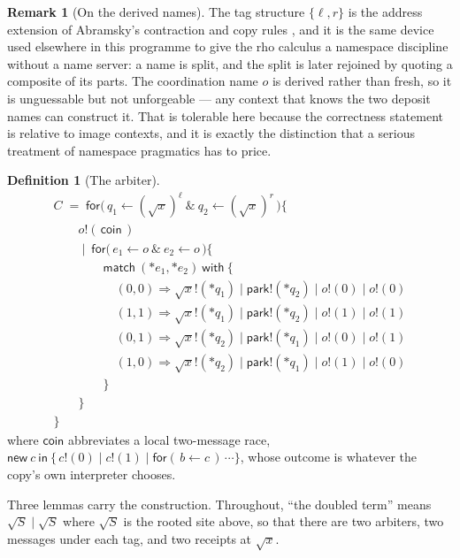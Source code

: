 \documentclass[11pt]{article}
\theoremstyle{definition}
\newtheorem{definition}[theorem]{Definition}
\newtheorem{remark}[theorem]{Remark}
\newcommand{\rhoc}{rho calculus}
\newcommand{\In}[2]{\mathsf{for}(\,#1 \leftarrow #2\,)}
\newcommand{\rt}[1]{\sqrt{#1}}
\begin{document}
\begin{remark}[On the derived names]
The tag structure $\{\ell, r\}$ is the address extension of Abramsky's contraction and copy rules \cite{Abramsky}, and it is the same device used elsewhere in this programme to give the \rhoc{} a namespace discipline without a name server: a name is split, and the split is later rejoined by quoting a composite of its parts. The coordination name $o$ is derived rather than fresh, so it is unguessable but not unforgeable --- any context that knows the two deposit names can construct it. That is tolerable here because the correctness statement is relative to image contexts, and it is exactly the distinction that a serious treatment of namespace pragmatics has to price.
\end{remark}

\begin{definition}[The arbiter]\label{def:arbiter}
\[
\begin{array}{l}
C \;=\; \mathsf{for}\big(\,q_1 \leftarrow (\rt{x})^{\ell}\ \&\ q_2 \leftarrow (\rt{x})^{r}\,\big)\big\{ \\
\qquad o!(\,\mathsf{coin}\,) \\
\qquad \mid\ \mathsf{for}\big(\,e_1 \leftarrow o\ \&\ e_2 \leftarrow o\,\big)\big\{ \\
\qquad\qquad \mathsf{match}\ ({*}e_1, {*}e_2)\ \mathsf{with}\ \{ \\
\qquad\qquad\quad (0,0) \Rightarrow \rt{x}!({*}q_1) \mid \mathsf{park}!({*}q_2) \mid o!(0) \mid o!(0) \\
\qquad\qquad\quad (1,1) \Rightarrow \rt{x}!({*}q_1) \mid \mathsf{park}!({*}q_2) \mid o!(1) \mid o!(1) \\
\qquad\qquad\quad (0,1) \Rightarrow \rt{x}!({*}q_2) \mid \mathsf{park}!({*}q_1) \mid o!(0) \mid o!(1) \\
\qquad\qquad\quad (1,0) \Rightarrow \rt{x}!({*}q_2) \mid \mathsf{park}!({*}q_1) \mid o!(1) \mid o!(0) \\
\qquad\qquad \} \\
\qquad \} \\
\}
\end{array}
\]
where $\mathsf{coin}$ abbreviates a local two-message race, $\mathsf{new}\ c\ \mathsf{in}\ \{\,c!(0) \mid c!(1) \mid \In{b}{c}\,\cdots\}$, whose outcome is whatever the copy's own interpreter chooses.
\end{definition}

Three lemmas carry the construction. Throughout, ``the doubled term'' means $\rt{S} \mid \rt{S}$ where $\rt{S}$ is the rooted site above, so that there are two arbiters, two messages under each tag, and two receipts at $\rt{x}$.
\end{document}
